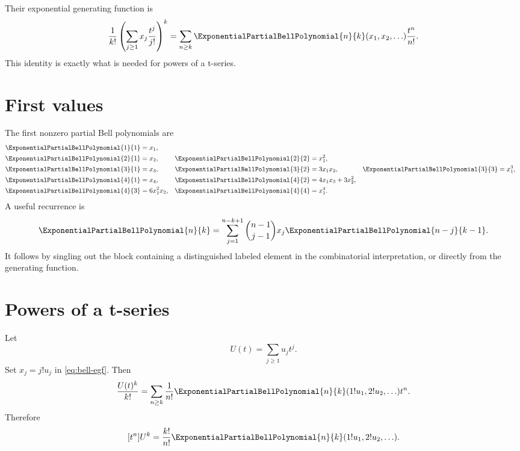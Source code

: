 \documentclass[11pt,openany]{book}
\theoremstyle{definition}
\theoremstyle{plain}
\theoremstyle{remark}
\begin{document}
Their exponential generating function is
\begin{equation}\label{eq:bell-egf}
 \frac1{k!}\left(\sum_{j\ge1}x_j\frac{t^j}{j!}\right)^k
 =\sum_{n\ge k}\ExponentialPartialBellPolynomial{n}{k}(x_1,x_2,\ldots)\frac{t^n}{n!}.
\end{equation}
This identity is exactly what is needed for powers of a t-series.

\section{First values}
The first nonzero partial Bell polynomials are
\begin{align*}
 \ExponentialPartialBellPolynomial{1}{1}&=x_1,\\
 \ExponentialPartialBellPolynomial{2}{1}&=x_2,
 &\ExponentialPartialBellPolynomial{2}{2}&=x_1^2,\\
 \ExponentialPartialBellPolynomial{3}{1}&=x_3,
 &\ExponentialPartialBellPolynomial{3}{2}&=3x_1x_2,
 &\ExponentialPartialBellPolynomial{3}{3}&=x_1^3,\\
 \ExponentialPartialBellPolynomial{4}{1}&=x_4,
 &\ExponentialPartialBellPolynomial{4}{2}&=4x_1x_3+3x_2^2,\\
 \ExponentialPartialBellPolynomial{4}{3}&=6x_1^2x_2,
 &\ExponentialPartialBellPolynomial{4}{4}&=x_1^4.
\end{align*}
A useful recurrence is
\begin{equation}\label{eq:bell-recurrence}
 \ExponentialPartialBellPolynomial{n}{k}
 =\sum_{j=1}^{n-k+1}
 \binom{n-1}{j-1}x_j\ExponentialPartialBellPolynomial{n-j}{k-1}.
\end{equation}
It follows by singling out the block containing a distinguished labeled
element in the combinatorial interpretation, or directly from the generating
function.

\section{Powers of a t-series}
Let
\[
 U(t)=\sum_{j\ge1}u_jt^j.
\]
Set \(x_j=j!u_j\) in \cref{eq:bell-egf}.  Then
\[
 \frac{U(t)^k}{k!}
 =\sum_{n\ge k}\frac1{n!}
 \ExponentialPartialBellPolynomial{n}{k}(1!u_1,2!u_2,\ldots)t^n.
\]
Therefore
\begin{equation}\label{eq:bell-U-power}
 [t^n]U^k
 =\frac{k!}{n!}\ExponentialPartialBellPolynomial{n}{k}(1!u_1,2!u_2,\ldots).
\end{equation}
\end{document}
